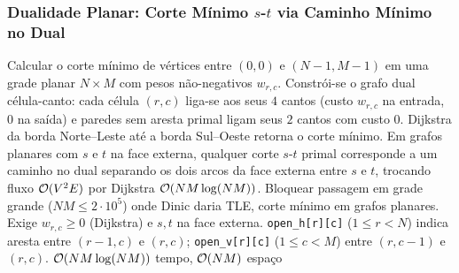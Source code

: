 \subsubsection{Dualidade Planar: Corte Mínimo $s$-$t$ via Caminho Mínimo no Dual}
\algobox
  {Calcular o corte mínimo de vértices entre $(0,0)$ e $(N-1,M-1)$ em uma grade planar $N \times M$ com pesos não-negativos $w_{r,c}$.}
  {Constrói-se o grafo dual célula-canto: cada célula $(r, c)$ liga-se aos seus $4$ cantos (custo $w_{r,c}$ na entrada, $0$ na saída) e paredes sem aresta primal ligam seus $2$ cantos com custo $0$. Dijkstra da borda Norte–Leste até a borda Sul–Oeste retorna o corte mínimo.}
  {Em grafos planares com $s$ e $t$ na face externa, qualquer corte $s$-$t$ primal corresponde a um caminho no dual separando os dois arcos da face externa entre $s$ e $t$, trocando fluxo $\mathcal{O}(V^2 E)$ por Dijkstra $\mathcal{O}(NM \log(NM))$.}
  {Bloquear passagem em grade grande ($NM \le 2 \cdot 10^5$) onde Dinic daria TLE, corte mínimo em grafos planares.}
  {Exige $w_{r,c} \ge 0$ (Dijkstra) e $s, t$ na face externa. \texttt{open\_h[r][c]} ($1 \le r < N$) indica aresta entre $(r-1,c)$ e $(r,c)$; \texttt{open\_v[r][c]} ($1 \le c < M$) entre $(r,c-1)$ e $(r,c)$.}
  {$\mathcal{O}(NM \log(NM))$ tempo, $\mathcal{O}(NM)$ espaço}

